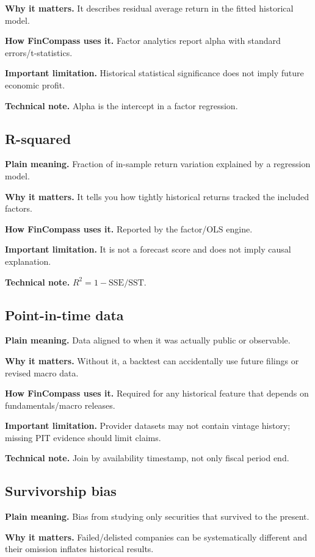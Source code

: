 \documentclass[11pt]{article}
\begin{document}
\textbf{Why it matters.} It describes residual average return in the fitted historical model.

\textbf{How FinCompass uses it.} Factor analytics report alpha with standard errors/t-statistics.

\textbf{Important limitation.} Historical statistical significance does not imply future economic profit.

\textbf{Technical note.} Alpha is the intercept in a factor regression.

\subsection{R-squared}
\textbf{Plain meaning.} Fraction of in-sample return variation explained by a regression model.

\textbf{Why it matters.} It tells you how tightly historical returns tracked the included factors.

\textbf{How FinCompass uses it.} Reported by the factor/OLS engine.

\textbf{Important limitation.} It is not a forecast score and does not imply causal explanation.

\textbf{Technical note.} $R^2=1-\mathrm{SSE}/\mathrm{SST}$.

\subsection{Point-in-time data}
\textbf{Plain meaning.} Data aligned to when it was actually public or observable.

\textbf{Why it matters.} Without it, a backtest can accidentally use future filings or revised macro data.

\textbf{How FinCompass uses it.} Required for any historical feature that depends on fundamentals/macro releases.

\textbf{Important limitation.} Provider datasets may not contain vintage history; missing PIT evidence should limit claims.

\textbf{Technical note.} Join by availability timestamp, not only fiscal period end.

\subsection{Survivorship bias}
\textbf{Plain meaning.} Bias from studying only securities that survived to the present.

\textbf{Why it matters.} Failed/delisted companies can be systematically different and their omission inflates historical results.
\end{document}
